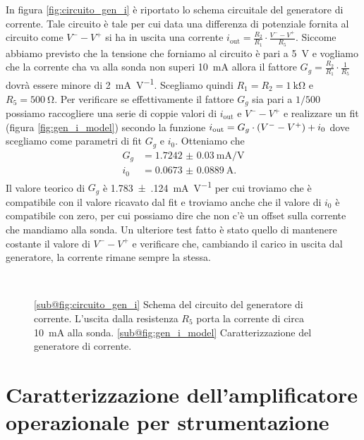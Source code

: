 \documentclass[
    prl,
    reprint, 
    superscriptaddress, 
    altaffilletter, 
    amsmath, 
    amssymb, 
    a4paper,
    varvw]{revtex4-2}
\begin{document}
In figura \ref{fig:circuito_gen_i} è riportato lo schema circuitale del generatore di corrente. Tale circuito è tale per cui data una differenza di potenziale fornita al circuito come $V^{-}-V^{+}$ si ha in uscita una corrente $i_\text{out}=\frac{R_2}{R_1}\cdot \frac{V^--V^+}{R_5}$. Siccome abbiamo previsto che la tensione che forniamo al circuito è pari a \SI{5}{\volt} e vogliamo che la corrente cha va alla sonda non superi \SI{10}{\milli\ampere} allora il fattore $G_g=\frac{R_2}{R_1}\cdot\frac{1}{R_5}$ dovrà essere minore di \SI{2}{\milli\ampere\per\volt}. Scegliamo quindi $R_{1}=R_{2}=\SI{1}{\kilo\ohm}$ e $R_{5}=\SI{500}{\ohm}$. Per verificare se effettivamente il fattore $G_g$ sia pari a $1/500$ possiamo raccogliere una serie di coppie valori di $i_\text{out}$ e $V^{-}-V^{+}$ e realizzare un fit (figura \ref{fig:gen_i_model}) secondo la funzione $i_\text{out}=G_g\cdot \qty(V^--V^+) + i_0$ dove scegliamo come parametri di fit $G_{g}$ e $i_0$. Otteniamo che \begin{align*}
    G_g &=\SI{1.7242(300)}{\milli\ampere \per\volt}\\
    i_0 &= \SI{0.0673(889)}{\ampere}.
\end{align*} Il valore teorico di $G_g$ è \SI{1.783(124)}{\milli\ampere\per\volt} per cui troviamo che è compatibile con il valore ricavato dal fit e troviamo anche che il valore di $i_0$ è compatibile con zero, per cui possiamo dire che non c'è un offset sulla corrente che mandiamo alla sonda.
Un ulteriore test fatto è stato quello di mantenere costante il valore di $V^--V^+$ e verificare che, cambiando il carico in uscita dal generatore, la corrente rimane sempre la stessa.

\begin{figure}
    \centering
    \\
    \caption{
        \ref{sub@fig:circuito_gen_i} Schema del circuito del generatore di corrente. L'uscita dalla resistenza $R_5$ porta la corrente di circa \SI{10}{\milli\ampere} alla sonda.
        \ref{sub@fig:gen_i_model} Caratterizzazione del generatore di corrente. 
    }
\end{figure}


\section{Caratterizzazione dell'amplificatore operazionale per strumentazione}\label{sec:appendix_strum_opamp}
\end{document}
